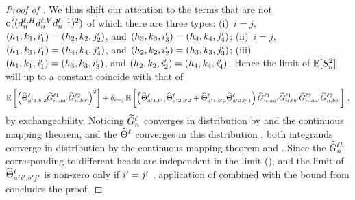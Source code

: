 \begin{proof}[Proof of ]
    We thus shift our attention to the terms that are not $\mathrm{o}( (d_{n}^{\ell, H} d_{n}^{\ell, V} d_{n}^{\ell - 1})^2 )$ of which there are three types: (i)~$i = j$, $(h_1, k_1, i'_1) = (h_2, k_2, j'_2)$, and $(h_3, k_3, i'_3) = (h_4, k_4, j'_4)$; (ii)~$i = j$, $(h_1, k_1, i'_1) = (h_4, k_4, j'_4)$, and $(h_2, k_2, i'_2) = (h_3, k_3, j'_3)$; (iii)~$(h_1, k_1, i'_1) = (h_3, k_3, i'_3)$, and $(h_2, k_2, i'_2) = (h_4, k_4, i'_4)$.
    Hence the limit of $\operatorname*{\mathbb{E}} [\bar{S}_{n}^2 ]$ will up to a constant coincide with that of 
    \begin{align*}
        \operatorname*{\mathbb{E}} \left[
            \left(
                \widehat{\Theta}_{
                    a' 1 ,
                    b' 2
                }^{\ell}
                \widetilde{G}_{n, a a'}^{\ell 1}
                \widetilde{G}_{n, b b'}^{\ell 2}
            \right)^2
        \right]
        +
        \delta_{i = j}
        \operatorname*{\mathbb{E}} \left[
            \left(
                \widehat{\Theta}_{
                    a' 1 ,
                    b' 1
                }^{\ell}
                \widehat{\Theta}_{
                    a' 2 ,
                    b' 2
                }^{\ell}
                +
                \widehat{\Theta}_{
                    a' 1 ,
                    b' 2
                }^{\ell}
                \widehat{\Theta}_{
                    a' 2 ,
                    b' 1
                }^{\ell}
            \right)
            \widetilde{G}_{n, a a'}^{\ell 1}
            \widetilde{G}_{n, b b'}^{\ell 1}
            \widetilde{G}_{n, a a'}^{\ell 2}
            \widetilde{G}_{n, b b'}^{\ell 2}
        \right]
        \, ,
    \end{align*}
    by exchangeability.
    Noticing $\widetilde{G}_{n}^{\ell}$ converges in distribution by  and the continuous mapping theorem, and the $\widehat{\Theta}^{\ell}$ converges in this distribution \citep{yang2019v2}, both integrands converge in distribution by the continuous mapping theorem and .
    Since the $\widetilde{G}_{n}^{\ell h}$ corresponding to different heads are independent in the limit (), and the limit of  $\widehat{\Theta}_{a' i' , b' j'}^{\ell}$ is non-zero only if $i' = j'$
    \citep{yang2019v2}, application of  combined with the bound from  concludes the proof.
\end{proof}


